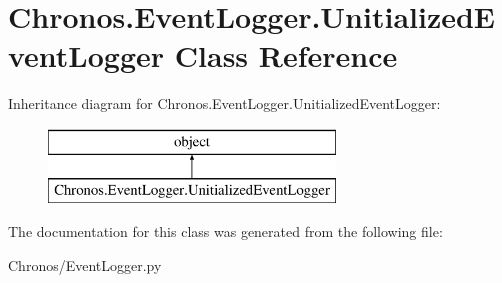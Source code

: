 \hypertarget{classChronos_1_1EventLogger_1_1UnitializedEventLogger}{}\section{Chronos.\+Event\+Logger.\+Unitialized\+Event\+Logger Class Reference}
\label{classChronos_1_1EventLogger_1_1UnitializedEventLogger}
Inheritance diagram for Chronos.\+Event\+Logger.\+Unitialized\+Event\+Logger\+:\begin{figure}[H]
\begin{center}
\leavevmode
\includegraphics[height=2.000000cm]{classChronos_1_1EventLogger_1_1UnitializedEventLogger}
\end{center}
\end{figure}


The documentation for this class was generated from the following file\+:\begin{DoxyCompactItemize}
\item 
Chronos/Event\+Logger.\+py\end{DoxyCompactItemize}
